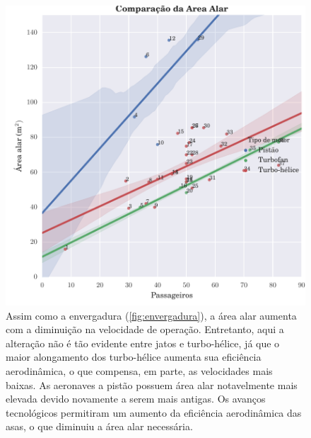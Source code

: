 \begin{figure}
\centering
\includegraphics{../autogenerated/graficos_comparativos/area.pdf}
\caption[Comparação da área]{Assim como a envergadura (\autoref{fig:envergadura}), a área alar aumenta com a diminuição na velocidade de operação. Entretanto, aqui a alteração não é tão evidente entre jatos e turbo-hélice, já que o maior alongamento dos turbo-hélice aumenta sua eficiência aerodinâmica, o que compensa, em parte, as velocidades mais baixas. As aeronaves a pistão possuem área alar notavelmente mais elevada devido novamente a serem mais antigas. Os avanços tecnológicos permitiram um aumento da eficiência aerodinâmica das asas, o que diminuiu a área alar necessária.}
\label{fig:area}
\end{figure}

